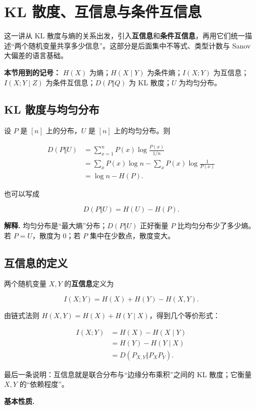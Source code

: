 \section{KL 散度、互信息与条件互信息}


这一讲从 KL 散度与熵的关系出发，引入\textbf{互信息}和\textbf{条件互信息}，再用它们统一描述“两个随机变量共享多少信息”。这部分是后面集中不等式、类型计数与 Sanov 大偏差的语言基础。

\textbf{本节用到的记号：} $H(X)$ 为熵；$H(X\mid Y)$ 为条件熵；$I(X;Y)$ 为互信息；$I(X;Y\mid Z)$ 为条件互信息；$D(P\Vert Q)$ 为 KL 散度；$U$ 为均匀分布。

\subsection{KL 散度与均匀分布}


设 $P$ 是 $[n]$ 上的分布，$U$ 是 $[n]$ 上的均匀分布。则

\[
\begin{aligned}
D(P\Vert U)
&=\sum_{x=1}^{n}P(x)\log\frac{P(x)}{1/n}\\
&=\sum_xP(x)\log n-\sum_xP(x)\log\frac1{P(x)}\\
&=\log n-H(P).
\end{aligned}
\]

也可以写成

\[
D(P\Vert U)=H(U)-H(P).
\]

\textbf{解释.} 均匀分布是“最大熵”分布；$D(P\Vert U)$ 正好衡量 $P$ 比均匀分布少了多少熵。若 $P=U$，散度为 $0$；若 $P$ 集中在少数点，散度变大。

\subsection{互信息的定义}


两个随机变量 $X,Y$ 的\textbf{互信息}定义为

\[
\boxed{
I(X;Y)
=H(X)+H(Y)-H(X,Y)
}.
\]

由链式法则 $H(X,Y)=H(X)+H(Y\mid X)$，得到几个等价形式：

\[
\begin{aligned}
I(X;Y)
&=H(X)-H(X\mid Y)\\
&=H(Y)-H(Y\mid X)\\
&=D(P_{X,Y}\Vert P_XP_Y).
\end{aligned}
\]

最后一条说明：互信息就是联合分布与“边缘分布乘积”之间的 KL 散度；它衡量 $X,Y$ 的“依赖程度”。

\textbf{基本性质.}

